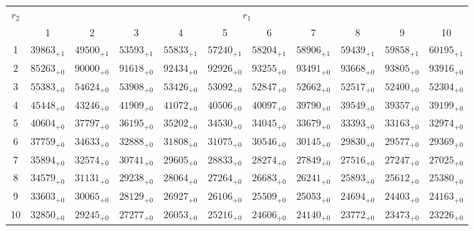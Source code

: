 \documentclass[10pt, a4paper]{article}
\begin{document}
\begin{center}
    \begin{tabular}{c || c c c c c | c c c c c}
        \multirow{2}{*}{\(r_2\)} & \multicolumn{10}{c}{\(r_1\)} \\
        & 1 & 2 & 3 & 4 & 5 & 6 & 7 & 8 & 9 & 10\\
        \hline\hline
        1 & \({39863}_{+1}\) & \({49500}_{+1}\) & \({53593}_{+1}\) & \({55833}_{+1}\) & \({57240}_{+1}\) & \({58204}_{+1}\) & \({58906}_{+1}\) & \({59439}_{+1}\) & \({59858}_{+1}\) & \({60195}_{+1}\)\\
        2 & \({85263}_{+0}\) & \({90000}_{+0}\) & \({91618}_{+0}\) & \({92434}_{+0}\) & \({92926}_{+0}\) & \({93255}_{+0}\) & \({93491}_{+0}\) & \({93668}_{+0}\) & \({93805}_{+0}\) & \({93916}_{+0}\)\\
        3 & \({55383}_{+0}\) & \({54624}_{+0}\) & \({53908}_{+0}\) & \({53426}_{+0}\) & \({53092}_{+0}\) & \({52847}_{+0}\) & \({52662}_{+0}\) & \({52517}_{+0}\) & \({52400}_{+0}\) & \({52304}_{+0}\)\\
        4 & \({45448}_{+0}\) & \({43246}_{+0}\) & \({41909}_{+0}\) & \({41072}_{+0}\) & \({40506}_{+0}\) & \({40097}_{+0}\) & \({39790}_{+0}\) & \({39549}_{+0}\) & \({39357}_{+0}\) & \({39199}_{+0}\)\\
        5 & \({40604}_{+0}\) & \({37797}_{+0}\) & \({36195}_{+0}\) & \({35202}_{+0}\) & \({34530}_{+0}\) & \({34045}_{+0}\) & \({33679}_{+0}\) & \({33393}_{+0}\) & \({33163}_{+0}\) & \({32974}_{+0}\)\\
        \hline
        6 & \({37759}_{+0}\) & \({34633}_{+0}\) & \({32888}_{+0}\) & \({31808}_{+0}\) & \({31075}_{+0}\) & \({30546}_{+0}\) & \({30145}_{+0}\) & \({29830}_{+0}\) & \({29577}_{+0}\) & \({29369}_{+0}\)\\
        7 & \({35894}_{+0}\) & \({32574}_{+0}\) & \({30741}_{+0}\) & \({29605}_{+0}\) & \({28833}_{+0}\) & \({28274}_{+0}\) & \({27849}_{+0}\) & \({27516}_{+0}\) & \({27247}_{+0}\) & \({27025}_{+0}\)\\
        8 & \({34579}_{+0}\) & \({31131}_{+0}\) & \({29238}_{+0}\) & \({28064}_{+0}\) & \({27264}_{+0}\) & \({26683}_{+0}\) & \({26241}_{+0}\) & \({25893}_{+0}\) & \({25612}_{+0}\) & \({25380}_{+0}\)\\
        9 & \({33603}_{+0}\) & \({30065}_{+0}\) & \({28129}_{+0}\) & \({26927}_{+0}\) & \({26106}_{+0}\) & \({25509}_{+0}\) & \({25053}_{+0}\) & \({24694}_{+0}\) & \({24403}_{+0}\) & \({24163}_{+0}\)\\
        10 & \({32850}_{+0}\) & \({29245}_{+0}\) & \({27277}_{+0}\) & \({26053}_{+0}\) & \({25216}_{+0}\) & \({24606}_{+0}\) & \({24140}_{+0}\) & \({23772}_{+0}\) & \({23473}_{+0}\) & \({23226}_{+0}\)\\

\end{tabular}
\end{center}
\end{document}
